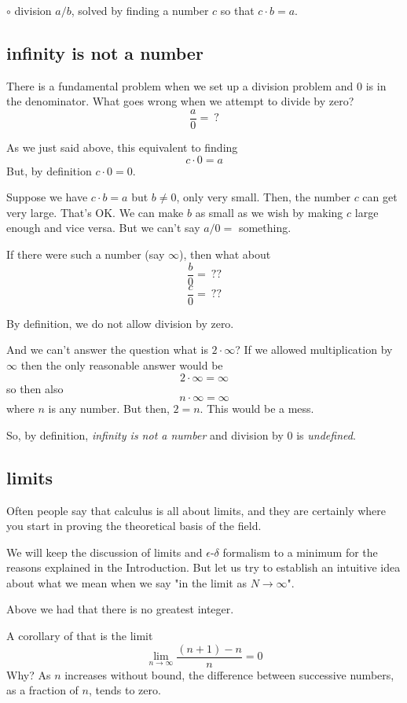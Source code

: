 \documentclass[11pt, oneside]{article}
\begin{document}
$\circ$ division $a/b$, solved by finding a number $c$ so that $c \cdot b = a$.

\subsection*{infinity is not a number}
There is a fundamental problem when we set up a division problem and $0$ is in the denominator.  What goes wrong when we attempt to divide by zero?
\[ \frac{a}{0} = \ ? \]

As we just said above, this equivalent to finding
\[ c \cdot 0 = a \]
But, by definition $c \cdot 0 = 0$.

Suppose we have $c \cdot b = a$ but $b \ne 0$, only very small.  Then, the number $c$ can get very large.  That's OK.  We can make $b$ as small as we wish by making $c$ large enough and vice versa.  But we can't say $a/0 = $ something.

If there were such a number (say $\infty$), then what about 
\[ \frac{b}{0} = \ ??  \]
\[ \frac{c}{0} = \ ??  \]

By definition, we do not allow division by zero.

And we can't answer the question what is $2 \cdot \infty$?  If we allowed multiplication by $\infty$ then the only reasonable answer would be
\[ 2 \cdot \infty = \infty \]
so then also
\[ n \cdot \infty = \infty \]
where $n$ is any number.  But then, $2 = n$.  This would be a mess.

So, by definition, \emph{infinity is not a number} and division by $0$ is \emph{undefined}.

\subsection*{limits}
Often people say that calculus is all about limits, and they are certainly where you start in proving the theoretical basis of the field.  

We will keep the discussion of limits and $\epsilon$-$\delta$ formalism to a minimum for the reasons explained in the Introduction.  But let us try to establish an intuitive idea about what we mean when we say "in the limit as $N \rightarrow \infty$".

Above we had that there is no greatest integer.

A corollary of that is the limit
\[ \lim_{n \rightarrow \infty} \frac{(n + 1) - n}{n} = 0 \]
Why?  As $n$ increases without bound, the difference between successive numbers, as a fraction of $n$, tends to zero.
\end{document}
